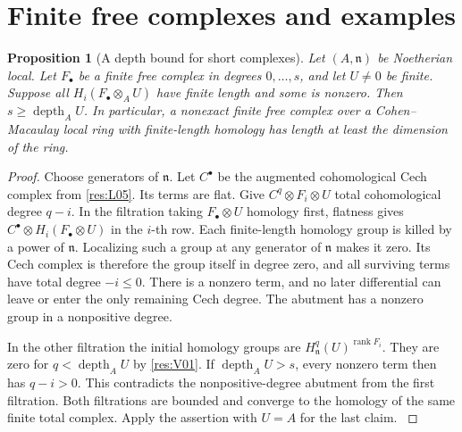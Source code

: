 \documentclass[11pt,oneside,openany]{book}
\newtheorem{proposition}[theorem]{Proposition}
\theoremstyle{definition}
\theoremstyle{remark}
\begin{document}
\section{Finite free complexes and examples}

\begin{proposition}[A depth bound for short complexes]\label{res:I14}
Let \((A,\mathfrak n)\) be Noetherian local. Let \(F_\bullet\)
be a finite free complex in degrees \(0,\ldots,s\), and let
\(U\ne0\) be finite. Suppose all \(H_i(F_\bullet\otimes_A U)\)
have finite length and some is nonzero. Then
\(s\ge\operatorname{depth}_A U\). In particular, a nonexact
finite free complex over a Cohen--Macaulay local ring with
finite-length homology has length at least the dimension
of the ring.
\end{proposition}
\begin{proof}
Choose generators of \(\mathfrak n\). Let \(C^\bullet\) be
the augmented cohomological Cech complex from \ref{res:L05}.
Its terms are flat. Give \(C^q\otimes F_i\otimes U\) total
cohomological degree \(q-i\). In the filtration taking
\(F_\bullet\otimes U\) homology first, flatness gives
\(C^\bullet\otimes H_i(F_\bullet\otimes U)\) in the \(i\)-th
row. Each finite-length homology group is killed by a power
of \(\mathfrak n\). Localizing such a group at any generator of
\(\mathfrak n\) makes it zero. Its Cech complex is therefore
the group itself in degree zero, and all surviving terms
have total degree \(-i\le 0\). There is a nonzero term, and
no later differential can leave or enter the only remaining
Cech degree. The abutment has a nonzero group in a
nonpositive degree.

In the other filtration the initial homology groups are
\(H^q_{\mathfrak n}(U)^{\operatorname{rank}F_i}\). They are
zero for \(q<\operatorname{depth}_A U\) by \ref{res:V01}.
If \(\operatorname{depth}_A U>s\), every nonzero term then
has \(q-i>0\). This contradicts the nonpositive-degree
abutment from the first filtration. Both filtrations are
bounded and converge to the homology of the same finite
total complex. Apply the assertion with \(U=A\) for the
last claim. \cite[\S 9.4, Corollary 9.4.3]{bruns}
\end{proof}
\end{document}
